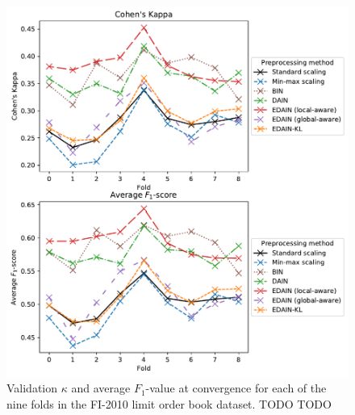 \documentclass{statsmsc}
\begin{document}
{%
\begin{figure}[htp]
\begin{center}
    \includegraphics[width=\textwidth]{figures/lob_performance_per_fold.pdf}
\end{center}
\caption{Validation $\kappa$ and average $F_1$-value at convergence for each of the
    nine folds in the FI-2010 limit order book dataset. TODO TODO}
\label{fig:lob_folds}
\end{figure}

}
\end{document}
